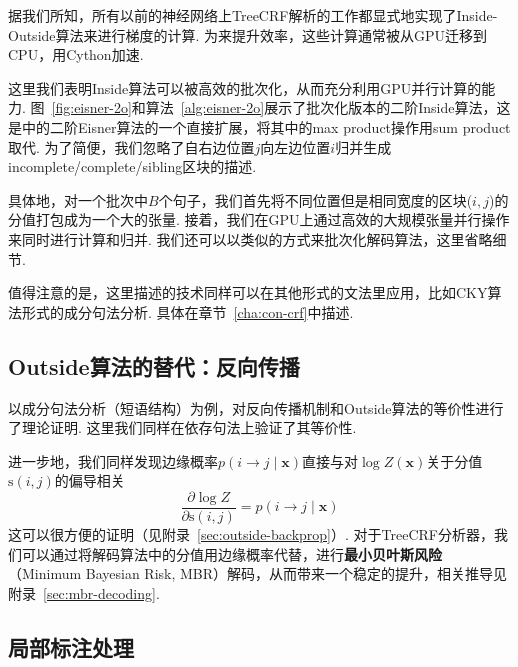 

据我们所知，所有以前的神经网络上TreeCRF解析的工作都显式地实现了Inside-Outside算法来进行梯度的计算\cite{zhang-etal-2019-empirical, jiang-etal-2018-supervised}.
为来提升效率，这些计算通常被从GPU迁移到CPU，用Cython加速.

这里我们表明Inside算法可以被高效的批次化，从而充分利用GPU并行计算的能力.
图~\ref{fig:eisner-2o}和算法~\ref{alg:eisner-2o}展示了批次化版本的二阶Inside算法，这是\cite{mcdonald-pereira-2006-online}中的二阶Eisner算法的一个直接扩展，将其中的max product操作用sum product取代.
为了简便，我们忽略了自右边位置$j$向左边位置$i$归并生成incomplete/complete/sibling区块的描述.

具体地，对一个批次中$B$个句子，我们首先将不同位置但是相同宽度的区块($i, j$)的分值打包成为一个大的张量.
接着，我们在GPU上通过高效的大规模张量并行操作来同时进行计算和归并.
我们还可以以类似的方式来批次化解码算法，这里省略细节.

值得注意的是，这里描述的技术同样可以在其他形式的文法里应用，比如CKY算法形式的成分句法分析\cite{finkel-etal-2008-efficient,drozdov-etal-2019-unsupervised}.
具体在章节~\ref{cha:con-crf}中描述.

\subsection{Outside算法的替代：反向传播}

\cite{eisner-2016-inside}以成分句法分析（短语结构）为例，对反向传播机制和Outside算法的等价性进行了理论证明.
这里我们同样在依存句法上验证了其等价性.

进一步地，我们同样发现边缘概率$p(i \rightarrow j\mid\boldsymbol{x})$直接与对$\log Z(\boldsymbol{x})$关于分值$\mathrm{s}(i,j)$的偏导相关
\begin{equation}
    \label{eq:partial-derivative}
    \frac{\partial \log Z}{\partial \mathrm{s}(i, j)} = p(i \rightarrow j\mid\boldsymbol{x})
\end{equation}
这可以很方便的证明（见附录~\ref{sec:outside-backprop}）.
对于TreeCRF分析器，我们可以通过将解码算法中的分值用边缘概率代替，进行\textbf{最小贝叶斯风险}（Minimum Bayesian Risk, MBR）解码\cite{smith-smith-2007-probabilistic}，从而带来一个稳定的提升，相关推导见附录~\ref{sec:mbr-decoding}.

\subsection{局部标注处理}
\label{sub@sec:partial-annotation}

